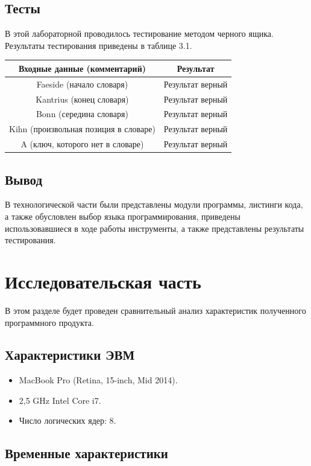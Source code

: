 \documentclass[12pt]{report}
\begin{document}
\section{Тесты}
В этой лабораторной проводилось тестирование методом черного ящика. Результаты тестирования приведены в таблице 3.1.

\begin{tabular}{|c c|}
		\hline
		Входные данные (комментарий) & Результат \\ [0.5ex] 
 		\hline\hline
		Faeside (начало словаря) & Результат верный\\
 		\hline
 		Kantrius (конец словаря) & Результат верный \\
 		\hline
 		Bonn (середина словаря) & Результат верный\\
 		\hline
		Kihn (произвольная позиция в словаре) & Результат верный\\
		\hline
		A (ключ, которого нет в словаре) & Результат верный\\
		\hline
\end{tabular}

\section{Вывод}
В технологической части были представлены модули программы, листинги кода, а также обусловлен выбор языка программирования, приведены использовавшиеся в ходе работы инструменты, а также представлены результаты тестирования.

\chapter{Исследовательская часть}

В этом разделе будет проведен сравнительный анализ характеристик полученного программного продукта.

\section{Характеристики ЭВМ}

\begin{itemize}
	\item MacBook Pro (Retina, 15-inch, Mid 2014).
	\item 2,5 GHz Intel Core i7.
	\item Число логических ядер: 8.
\end{itemize}

\section{Временные характеристики} 
\end{document}
